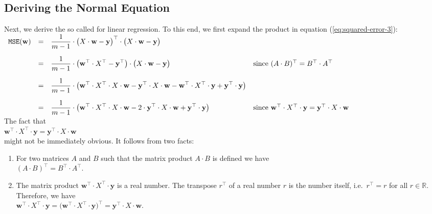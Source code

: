 \subsection{Deriving the Normal Equation}
Next, we derive the so called  
for linear regression.  To this end, we first
expand the product in equation (\ref{eq:squared-error-3}):
\\[0.2cm]
\hspace*{0.3cm}
$
\begin{array}[t]{lcll}
 \mathtt{MSE}(\mathbf{w}) & = & 
 \displaystyle \frac{1}{m-1} \cdot \bigl(X \cdot \mathbf{w} - \textbf{y}\bigr)^\top \cdot \bigl(X \cdot \mathbf{w} - \textbf{y}\bigr) 
 \\[0.5cm]
 & = & 
 \displaystyle \frac{1}{m-1} \cdot \bigl(\mathbf{w}^\top \cdot X^\top - \textbf{y}^\top\bigr) \cdot \bigl(X \cdot \mathbf{w} - \textbf{y}\bigr) 
 & \mbox{since $(A \cdot B)^\top = B^\top \cdot A^\top$}
 \\[0.5cm]
 & = & 
 \displaystyle \frac{1}{m-1} \cdot \bigl(\mathbf{w}^\top \cdot X^\top \cdot X \cdot \mathbf{w} 
                             - \textbf{y}^\top \cdot X \cdot \mathbf{w} 
                             - \mathbf{w}^\top \cdot X^\top \cdot \mathbf{y}
                             + \mathbf{y}^\top \cdot \mathbf{y}
                       \bigr)
 \\[0.5cm]
 & = & 
 \displaystyle \frac{1}{m-1} \cdot \bigl(\mathbf{w}^\top \cdot X^\top \cdot X \cdot \mathbf{w} 
                             - 2 \cdot \textbf{y}^\top \cdot X \cdot \mathbf{w} 
                             + \mathbf{y}^\top \cdot \mathbf{y}
                       \bigr)
 & \mbox{since $\mathbf{w}^\top \cdot X^\top \cdot \mathbf{y} = \textbf{y}^\top \cdot X \cdot \mathbf{w}$}
\end{array}
$
\\[0.2cm]
The fact that 
\\[0.2cm]
\hspace*{1.3cm}
$\mathbf{w}^\top \cdot X^\top \cdot \mathbf{y} = \textbf{y}^\top \cdot X \cdot \mathbf{w}$
\\[0.2cm]
might not be immediately obvious.  It follows from two facts:
\begin{enumerate}
\item For two matrices $A$ and $B$ such that the matrix product $A \cdot B$ is defined we have 
      \\[0.2cm]
      \hspace*{1.3cm}
      $(A \cdot B)^\top = B^\top \cdot A^\top$.
\item The matrix product $\mathbf{w}^\top \cdot X^\top \cdot \mathbf{y}$ is a real number.  The transpose $r^\top$ of a real number $r$ is the number
      itself, i.e.~$r^\top = r$ for all $r \in \mathbb{R}$.  Therefore, we have
      \\[0.2cm]
      \hspace*{1.3cm}
      $\mathbf{w}^\top \cdot X^\top \cdot \mathbf{y} = 
\bigl(\mathbf{w}^\top \cdot X^\top \cdot \mathbf{y}\bigr)^\top =
\mathbf{y}^\top \cdot X \cdot \mathbf{w}
$.
\end{enumerate}
